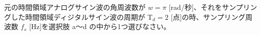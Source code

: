 元の時間領域アナログサイン波の角周波数が $w = \pi$ [rad/秒]、それをサンプリングした時間領域ディジタルサイン波の周期が $\textrm{T}_d = 2$ [点]の時、サンプリング周波数 $f_s$ [Hz]を選択肢 a〜d の中から1つ選びなさい。
